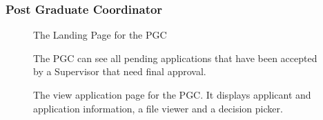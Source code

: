 \documentclass[11pt]{article}
\begin{document}
\subsubsection{Post Graduate Coordinator}
\begin{figure}[H]
	\caption{The Landing Page for the PGC}
\end{figure}

\begin{figure}[H]
	\caption{The PGC can see all pending applications that have been accepted by a Supervisor that need final approval.}
\end{figure}
\begin{figure}[H]
	\caption{The view application page for the PGC. It displays applicant and application information, a file viewer and a decision picker.}
\end{figure}
\end{document}
